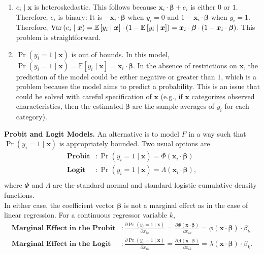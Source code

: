 \begin{enumerate}
	\item $e_i \mid \bm{x}$ is heteroskedastic. This follows because $\bm{x}_i \cdot \bm{\beta} + e_i$ is either $0$ or $1$. Therefore, $e_i$ is binary: It is $- \bm{x}_i \cdot \bm{\beta}$ when $y_i = 0$ and $1 - \bm{x}_i \cdot \bm{\beta}$ when $y_i = 1$. Therefore, $\operatorname{Var}\left( e_i \mid \bm{x} \right)  = \mathbb{E} \left[ y_i \mid \bm{x} \right] \cdot \left( 1 - \mathbb{E} \left[ y_i \mid \bm{x} \right]  \right) = \bm{x}_i \cdot \bm{\beta} \cdot \left( 1 - \bm{x}_i \cdot \bm{\beta} \right)$. This problem is straightforward.
	\item $\Pr \left( y_i = 1 \mid \bm{x} \right)$ is out of bounds. In this model, $\Pr \left( y_i = 1 \mid \bm{x} \right) = \mathbb{E} \left[ y_i \mid \bm{x} \right] = \bm{x}_i \cdot \bm{\beta}$. In the absence of restrictions on $\bm{x}$, the prediction of the model could be either negative or greater than $1$, which is a problem because the model aims to predict a probability. This is an issue that could be solved with careful specification of $\bm{x}$ (e.g., if $\bm{x}$ categorizes observed characteristics, then the estimated $\bm{\beta}$ are the sample averages of $y_i$ for each category). 
\end{enumerate}

\noindent \textbf{Probit and Logit Models.} An alternative is to model $F$ in a way such that $\Pr \left( y_i = 1 \mid \bm{x} \right)$ is appropriately bounded. Two usual options are 
\begin{align}
	\textbf{Probit} &: \Pr \left( y_i = 1 \mid \bm{x} \right)  = \Phi \left( \bm{x}_i \cdot \bm{\beta} \right)  \nonumber \\ 
	\textbf{Logit}  &: \Pr \left( y_i = 1 \mid \bm{x} \right)  = \Lambda \left( \bm{x}_i \cdot \bm{\beta} \right) \nonumber,  \\
\end{align}
\noindent where $\Phi$ and $\Lambda$ are the standard normal and standard logistic  cumulative density functions.\\

\noindent In either case, the coefficient vector $\bm{\beta}$ is not a marginal effect as in the case of linear regression. For a continuous regressor variable $k$, 
	\begin{align}
	\textbf{Marginal Effect in the Probit} &: \frac{\partial \Pr \left( y_i = 1 \mid \bm{x} \right)} {\partial x_{ik} } = \frac{\partial  \Phi \left( \bm{x} \cdot \bm{\beta} \right) } {\partial x_{ik} } = \phi\left( \bm{x} \cdot \bm{\beta} \right) \cdot \beta_k   \nonumber \\ 
	\textbf{Marginal Effect in the Logit} &: \frac{\partial \Pr \left( y_i = 1 \mid \bm{x} \right)} {\partial x_{ik} } = \frac{\partial  \Lambda \left( \bm{x} \cdot \bm{\beta} \right) } {\partial x_{ik} } = \lambda\left( \bm{x} \cdot \bm{\beta} \right) \cdot \beta_k \nonumber.
\end{align}

